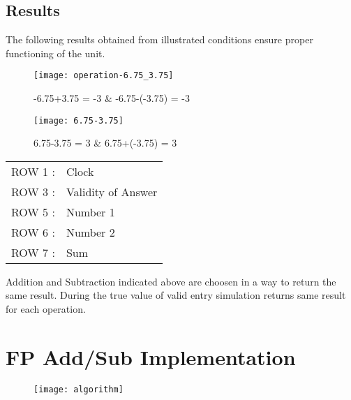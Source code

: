 \documentclass[11pt]{article}
\begin{document}
    \subsection{Results}
    The following results obtained from illustrated conditions ensure proper functioning of the unit.
    \begin{figure}[h]
        \begin{minipage}{.45\textwidth}
            \begin{center}
                \texttt{[image: operation-6.75\_3.75]}
                \caption*{-6.75+3.75 = -3 \& -6.75-(-3.75) = -3}
            \end{center}
        \end{minipage}
        \begin{minipage}{.45\textwidth}
            \begin{center}
                \texttt{[image: 6.75-3.75]}
                \caption*{6.75-3.75 = 3 \& 6.75+(-3.75) = 3}
            \end{center}
        \end{minipage}
    \end{figure}
    \newline
    \begin{tabular}{l l}
        ROW 1 : & Clock \\
        ROW 3 : & Validity of Answer\\
        ROW 5 : & Number 1 \\
        ROW 6 : & Number 2 \\
        ROW 7 : & Sum
    \end{tabular}
    \vspace{.2cm}
    \newline
    Addition and Subtraction indicated above are choosen in a way to return the same result. During the true value of valid entry simulation returns same result for each operation.

\newpage
\appendix
    \section{FP Add/Sub Implementation}
    \begin{figure}[h]
        \begin{center}
            \texttt{[image: algorithm]}
        \end{center}
    \end{figure}
\end{document}
